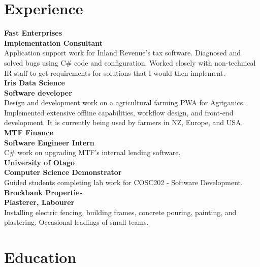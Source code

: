 \documentclass[lighthipster]{simplehipstercv}
\begin{document}
\begin{paracol}{2}
\begin{minipage}[t]{0.7\textwidth}
    \section*{Experience}
    
    \textbf{Fast Enterprises}\\
    \textbf{Implementation Consultant}\\
    Application support work for Inland Revenue's tax software. Diagnosed and solved bugs using C\# code and configuration. Worked closely with non-technical IR staff to get requirements for solutions that I would then implement. \\
    
    \textbf{Iris Data Science}\\
    \textbf{Software developer}\\
    Design and development work on a agricultural farming PWA for Agriganics. 
        Implemented extensive offline capabilities, workflow design, and front-end development.
        It is currently being used by farmers in NZ, Europe, and USA.\\
    
    \textbf{MTF Finance}\\
    \textbf{Software Engineer Intern}\\
    C\# work on upgrading MTF's internal lending software.\\
    
    \textbf{University of Otago}\\
    \textbf{Computer Science Demonstrator}\\
    Guided students completing lab work for COSC202 - Software Development.\\
    
    \textbf{Brockbank Properties}\\
    \textbf{Plasterer, Labourer}\\
    Installing electric fencing, building frames, concrete pouring, painting, and plastering. Occasional leadings of small teams.\\
      
    \end{minipage}    
    
    \bigskip
    
    \begin{minipage}[t]{0.7\textwidth}
    
    \section*{Education}
    

\end{minipage}
\end{paracol}
\end{document}
